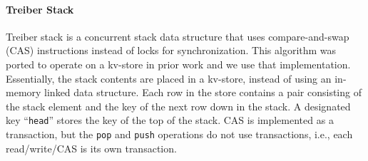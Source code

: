\paragraph{Treiber Stack \cite{DBLP:conf/cav/NagarMJ20}}
Treiber stack is a concurrent stack data structure that uses 
compare-and-swap (CAS) instructions instead of locks for synchronization. This
algorithm was ported to operate on a kv-store in prior work \cite{DBLP:conf/cav/NagarMJ20}
and we use that implementation. Essentially, the stack contents are placed in
a kv-store, instead of using an in-memory linked data structure.
Each row in the store contains a pair consisting of the stack element and the key of the next
row down in the stack. A designated key ``{\tt head}'' stores the key of the
top of the stack. CAS is implemented as a transaction, but the 
\texttt{pop} and \texttt{push} operations do not use transactions, i.e., each
read/write/CAS is its own transaction.



